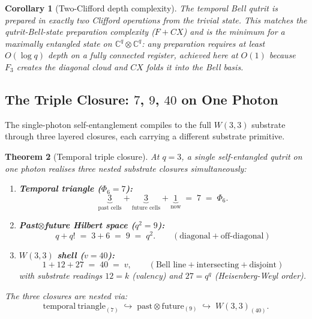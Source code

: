 ﻿\documentclass[12pt]{article}
\newtheorem{theorem}{Theorem}[section]
\newtheorem{corollary}[theorem]{Corollary}
\newcommand{\CC}{\mathbb{C}}
\begin{document}
\begin{corollary}[Two-Clifford depth complexity]\label{cor:depth2}
The temporal Bell qutrit is prepared in \emph{exactly two} Clifford
operations from the trivial state.  This matches the qutrit-Bell-state
preparation complexity ($F + CX$) and is the minimum for a maximally
entangled state on $\CC^q \otimes \CC^q$: any preparation requires at least
$O(\log q)$ depth on a fully connected register, achieved here at $O(1)$
because $F_3$ creates the diagonal cloud and $CX$ folds it into the Bell
basis.
\end{corollary}

\subsection{The Triple Closure: $7$, $9$, $40$ on One Photon}
\label{sec:triple_closure}

The single-photon self-entanglement compiles to the full $W(3,3)$ substrate
through three layered closures, each carrying a different substrate primitive.

\begin{theorem}[Temporal triple closure]\label{thm:triple_closure}
At $q = 3$, a single self-entangled qutrit on one photon realises three nested
substrate closures simultaneously:
\begin{enumerate}[label=(\arabic*),noitemsep]
  \item \textbf{Temporal triangle ($\Phi_6 = 7$):}
    \begin{equation}
      \underbrace{3}_{\text{past cells}} + \underbrace{3}_{\text{future cells}}
      + \underbrace{1}_{\text{now}} \;=\; 7 \;=\; \Phi_6.
    \end{equation}
  \item \textbf{Past$\otimes$future Hilbert space ($q^2 = 9$):}
    \begin{equation}
      q + q!  \;=\; 3 + 6 \;=\; 9 \;=\; q^2.
      \qquad (\text{diagonal} + \text{off-diagonal})
    \end{equation}
  \item \textbf{$W(3,3)$ shell ($v = 40$):}
    \begin{equation}
      1 + 12 + 27 \;=\; 40 \;=\; v,
      \qquad (\text{Bell line} + \text{intersecting} + \text{disjoint})
    \end{equation}
    with substrate readings $12 = k$ (valency) and $27 = q^q$ (Heisenberg-Weyl
    order).
\end{enumerate}
The three closures are nested via:
\begin{equation}
  \mathrm{temporal\ triangle}_{(7)}  \;\hookrightarrow\;
  \mathrm{past}\otimes\mathrm{future}_{(9)}  \;\hookrightarrow\;
  W(3,3)_{(40)}.
\end{equation}
\end{theorem}
\end{document}
